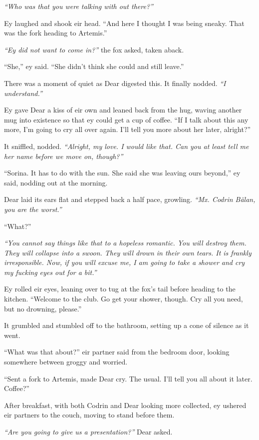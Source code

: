 \emph{``Who was that you were talking with out there?''}

Ey laughed and shook eir head. ``And here I thought I was being sneaky. That was the fork heading to Artemis.''

\emph{``Ey did not want to come in?''} the fox asked, taken aback.

``She,'' ey said. ``She didn't think she could and still leave.''

There was a moment of quiet as Dear digested this. It finally nodded. \emph{``I understand.''}

Ey gave Dear a kiss of eir own and leaned back from the hug, waving another mug into existence so that ey could get a cup of coffee. ``If I talk about this any more, I'm going to cry all over again. I'll tell you more about her later, alright?''

It sniffled, nodded. \emph{``Alright, my love. I would like that. Can you at least tell me her name before we move on, though?''}

``Sorina. It has to do with the sun. She said she was leaving ours beyond,'' ey said, nodding out at the morning.

Dear laid its ears flat and stepped back a half pace, growling. \emph{``Mx. Codrin Bălan, you are the worst.''}

``What?''

\emph{``You cannot say things like that to a hopeless romantic. You will destroy them. They will collapse into a swoon. They will drown in their own tears. It is frankly irresponsible. Now, if you will excuse me, I am going to take a shower and cry my fucking eyes out for a bit.''}

Ey rolled eir eyes, leaning over to tug at the fox's tail before heading to the kitchen. ``Welcome to the club. Go get your shower, though. Cry all you need, but no drowning, please.''

It grumbled and stumbled off to the bathroom, setting up a cone of silence as it went.

``What was that about?'' eir partner said from the bedroom door, looking somewhere between groggy and worried.

``Sent a fork to Artemis, made Dear cry. The usual. I'll tell you all about it later. Coffee?''

After breakfast, with both Codrin and Dear looking more collected, ey ushered eir partners to the couch, moving to stand before them.

\emph{``Are you going to give us a presentation?''} Dear asked.

